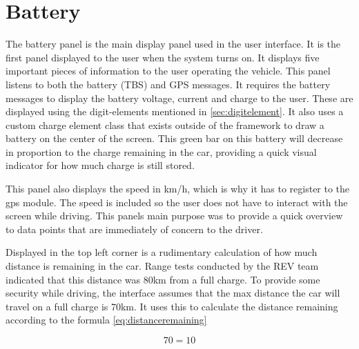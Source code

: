 

\section{Battery}

The battery panel is the main display panel used in the user interface. It is the first panel displayed to the user when the system turns on.  It displays five important pieces of information to the user operating the vehicle. This panel listens to both the battery (TBS) and GPS messages. It requires the battery messages to display the battery voltage, current and charge to the user. These are displayed using the digit-elements mentioned in \ref{sec:digitelement}. It also uses a custom charge element class that exists outside of the framework to draw a battery on the center of the screen. This green bar on this battery will decrease in proportion to the charge remaining in the car, providing a quick visual indicator for how much charge is still stored. 

This panel also displays the speed in km/h, which is why it has to register to the gps module. The speed is included so the user does not have to interact with the screen while driving. This panels main purpose was to provide a quick overview to data points that are immediately of concern to the driver. 

Displayed in the top left corner is a rudimentary calculation of how much distance is remaining in the car. Range tests conducted by the REV team indicated that this distance was 80km from a full charge. To provide some security while driving, the interface assumes that the max distance the car will travel on a full charge is 70km. It uses this to calculate the distance remaining according to the formula \ref{eq:distanceremaining}

\begin{equation}
\label{eq:distanceremaining}
70=10
\end{equation}





